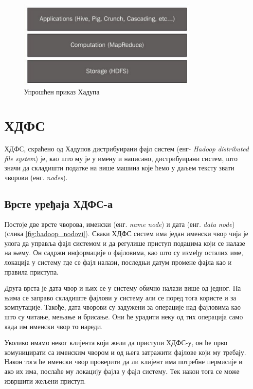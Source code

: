 \documentclass[12pt,oneside]{memoir}
\begin{document}
\begin{figure}[!ht]
  \centering
  \includegraphics[width=0.8\textwidth]{pictures/hadoop_apps.png}
  \caption{Упрошћен приказ Хадупа}
  \label{fig:hadoop_aplikacije}
\end{figure}


\section{ХДФС}
\label{sec:hdfs}

ХДФС, скраћено од Хадупов дистрибуирани фајл систем (енг- \textit{Hadoop distributed file system}) је, као што му је у имену и написано, дистрибуирани систем, што значи да складишти податке на више машина које ћемо у даљем тексту звати чворови (енг. \textit{nodes}). 

\subsection{Врсте уређаја ХДФС-а}
\label{subsec:hdfs_nodes}

Постоје две врсте чворова, именски (енг. \textit{name node}) и дата (енг. \textit{data node}) (слика \ref{fig:hadoop_nodovi}). Сваки ХДФС систем има један именски чвор чија је улога да управља фајл системом и да регулише приступ подацима који се налазе на њему. Он садржи информације о фајловима, као што су између осталих име, локација у систему где се фајл налази, последњи датум промене фајла као и правила приступа. \cite{hadoop_arch_guide}

Друга врста је дата чвор и њих се у систему обично налази више од једног. На њима се заправо складиште фајлови у систему али се поред тога користе и за компутације. Такође, дата чворови су задужени за операције над фајловима као што су читање, мењање и брисање. Они ће урадити неку од тих операција само када им именски чвор то нареди. \cite{hadoop_arch_guide}

Уколико имамо неког клијента који жели да приступи ХДФС-у, он ће прво комуницирати са именским чвором и од њега затражити фајлове који му требају. Након тога ће именски чвор проверити да ли клијент има потребне пермисије и ако их има, послаће му локацију фајла у фајл систему. Тек након тога се може извршити жељени приступ. 
\end{document}

